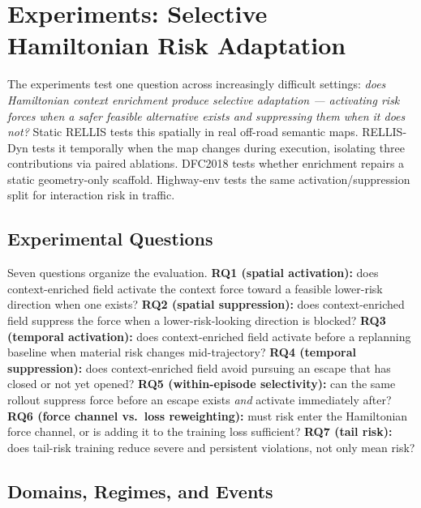 \section{Experiments: Selective Hamiltonian Risk Adaptation}
\label{sec:experiments}

The experiments test one question across increasingly difficult settings:
\emph{does Hamiltonian context enrichment produce selective adaptation ---
activating risk forces when a safer feasible alternative exists and
suppressing them when it does not?}
Static RELLIS tests this spatially in real off-road semantic maps.
RELLIS-Dyn tests it temporally when the map changes during execution,
isolating three contributions via paired ablations.
DFC2018 tests whether enrichment repairs a static geometry-only scaffold.
Highway-env tests the same activation/suppression split for interaction
risk in traffic.

\subsection{Experimental Questions}
\label{sec:exp_questions}

Seven questions organize the evaluation.
\textbf{RQ1 (spatial activation):} does context-enriched field activate the context
force toward a feasible lower-risk direction when one exists?
\textbf{RQ2 (spatial suppression):} does context-enriched field suppress the force
when a lower-risk-looking direction is blocked?
\textbf{RQ3 (temporal activation):} does context-enriched field activate before a
replanning baseline when material risk changes mid-trajectory?
\textbf{RQ4 (temporal suppression):} does context-enriched field avoid pursuing an
escape that has closed or not yet opened?
\textbf{RQ5 (within-episode selectivity):} can the same rollout
suppress force before an escape exists \emph{and} activate immediately
after?
\textbf{RQ6 (force channel vs.\ loss reweighting):} must risk enter the
Hamiltonian force channel, or is adding it to the training loss
sufficient?
\textbf{RQ7 (tail risk):} does tail-risk training reduce severe and
persistent violations, not only mean risk?

\subsection{Domains, Regimes, and Events}
\label{sec:exp_domains}


